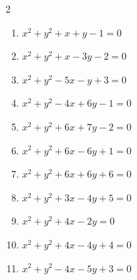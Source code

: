 \begin{multicols}{2}
\begin{enumerate}
  \item $x^{2}+y^{2}+x+y-1=0$


  \item $x^{2}+y^{2}+x-3y-2=0$


  \item $x^{2}+y^{2}-5x-y+3=0$


  \item $x^{2}+y^{2}-4x+6y-1=0$


  \item $x^{2}+y^{2}+6x+7y-2=0$


  \item $x^{2}+y^{2}+6x-6y+1=0$


  \item $x^{2}+y^{2}+6x+6y+6=0$


  \item $x^{2}+y^{2}+3x-4y+5=0$


\columnbreak %

\resetques

  \item $x^{2}+y^{2}+4x-2y=0$


  \item $x^{2}+y^{2}+4x-4y+4=0$

        \phantom{$\displaystyle 中心\: \left(-2,2\right), \quad 半径 \ 2$}

  \item $x^{2}+y^{2}-4x-5y+3=0$


\end{enumerate}
\end{multicols}
